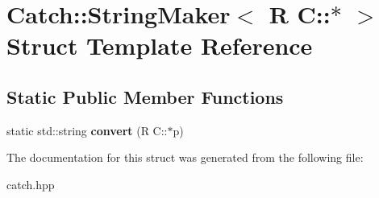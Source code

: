 \hypertarget{structCatch_1_1StringMaker_3_01R_01C_1_1_5_01_4}{}\section{Catch\+:\+:String\+Maker$<$ R C\+:\+:$\ast$ $>$ Struct Template Reference}
\label{structCatch_1_1StringMaker_3_01R_01C_1_1_5_01_4}
\subsection*{Static Public Member Functions}
\begin{DoxyCompactItemize}
\item 
static std\+::string {\bfseries convert} (R C\+::$\ast$p)\hypertarget{structCatch_1_1StringMaker_3_01R_01C_1_1_5_01_4_af69c15e0b406e945777137fe4a333731}{}\label{structCatch_1_1StringMaker_3_01R_01C_1_1_5_01_4_af69c15e0b406e945777137fe4a333731}

\end{DoxyCompactItemize}


The documentation for this struct was generated from the following file\+:\begin{DoxyCompactItemize}
\item 
catch.\+hpp\end{DoxyCompactItemize}
